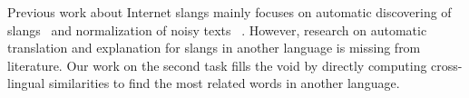 Previous work about Internet slangs mainly focuses on automatic 
discovering of slangs~\cite{elsahar2014a} and normalization of noisy texts ~\cite{han2012automatically}. However, research on automatic 
translation and explanation for slangs in another language is missing from literature. 
Our work on the second task fills the void  by directly computing cross-lingual 
similarities to find the most related words in another language.

